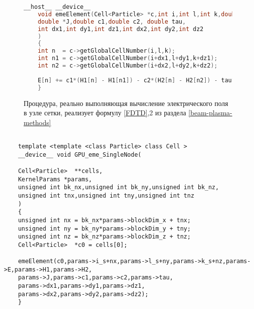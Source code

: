 \begin{figure}[h]
	\begin{lstlisting}[language=c]
	__host__ __device__                                                                                                    
	void emeElement(Cell<Particle> *c,int i,int l,int k,double *E,double *H1, double *H2,                          
	double *J,double c1,double c2, double tau,                                                     
	int dx1,int dy1,int dz1,int dx2,int dy2,int dz2                                                
	)                                                                                              
	{                                                                                                              
	int n  = c->getGlobalCellNumber(i,l,k);                                                                     
	int n1 = c->getGlobalCellNumber(i+dx1,l+dy1,k+dz1);                                                          
	int n2 = c->getGlobalCellNumber(i+dx2,l+dy2,k+dz2);                                                          
	
	E[n] += c1*(H1[n] - H1[n1]) - c2*(H2[n] - H2[n2]) - tau*J[n];                                                
	}   
	\end{lstlisting}
	\caption{Процедура, реально выполняющая вычисление электрического поля в узле сетки, реализует формулу \ref{FDTD},2 из раздела \ref{beam-plasma-methods}}
	\label{listing-real-computer}
\end{figure}

\begin{ListingEnv}[!h]
	\captiondelim{ } %
	\caption{Ядро CUDA, предназначенное для вычисления электрического поля, адаптированное под универсальный формат вызова}
	\label{listing-computer-universal-format}	
	\begin{lstlisting}[language={[ISO]C++}]

	template <template <class Particle> class Cell >
	__device__ void GPU_eme_SingleNode(
	
	Cell<Particle>  **cells,
	KernelParams *params,
	unsigned int bk_nx,unsigned int bk_ny,unsigned int bk_nz,
	unsigned int tnx,unsigned int tny,unsigned int tnz
	)
	{
	unsigned int nx = bk_nx*params->blockDim_x + tnx;
	unsigned int ny = bk_ny*params->blockDim_y + tny;
	unsigned int nz = bk_nz*params->blockDim_z + tnz;
	Cell<Particle>  *c0 = cells[0];
	
	emeElement(c0,params->i_s+nx,params->l_s+ny,params->k_s+nz,params->E,params->H1,params->H2,
	params->J,params->c1,params->c2,params->tau,
	params->dx1,params->dy1,params->dz1,
	params->dx2,params->dy2,params->dz2);
	}
\end{lstlisting}
\end{ListingEnv}	
	

